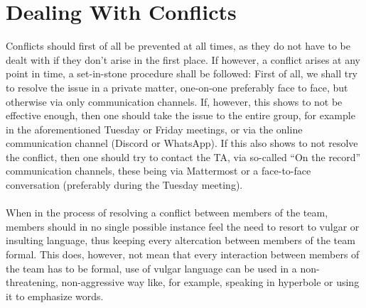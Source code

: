 \section{Dealing With Conflicts}
Conflicts should first of all be prevented at all times, as they do not have to be dealt with if they don’t arise in the first place. If however, a conflict arises at any point in time, a set-in-stone procedure shall be followed: First of all, we shall try to resolve the issue in a private matter, one-on-one preferably face to face, but otherwise via only communication channels. If, however, this shows to not be effective enough, then one should take the issue to the entire group, for example in the aforementioned Tuesday or Friday meetings, or via the online communication channel (Discord or WhatsApp). If this also shows to not resolve the conflict, then one should try to contact the TA, via so-called “On the record” communication channels, these being via Mattermost or a face-to-face conversation (preferably during the Tuesday meeting).
\\\\
When in the process of resolving a conflict between members of the team, members should in no single possible instance feel the need to resort to vulgar or insulting language, thus keeping every altercation between members of the team formal. This does, however, not mean that every interaction between members of the team has to be formal, use of vulgar language can be used in a non-threatening, non-aggressive way like, for example, speaking in hyperbole or using it to emphasize words.
